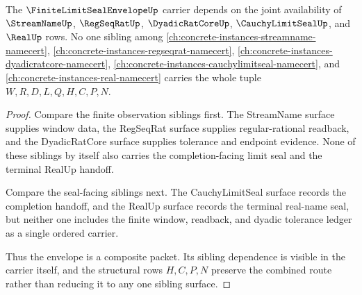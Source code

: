 \begin{theorem}
\label{thm:finite-limit-seal-envelope-sibling-dependency}
The $\FiniteLimitSealEnvelopeUp$ carrier depends on the joint availability of $\StreamNameUp$, $\RegSeqRatUp$, $\DyadicRatCoreUp$, $\CauchyLimitSealUp$, and $\RealUp$ rows. No one sibling among \autoref{ch:concrete-instances-streamname-namecert}, \autoref{ch:concrete-instances-regseqrat-namecert}, \autoref{ch:concrete-instances-dyadicratcore-namecert}, \autoref{ch:concrete-instances-cauchylimitseal-namecert}, and \autoref{ch:concrete-instances-real-namecert} carries the whole tuple $W,R,D,L,Q,H,C,P,N$.
\end{theorem}
\begin{proof}
Compare the finite observation siblings first. The StreamName surface supplies window data, the RegSeqRat surface supplies regular-rational readback, and the DyadicRatCore surface supplies tolerance and endpoint evidence. None of these siblings by itself also carries the completion-facing limit seal and the terminal RealUp handoff.

Compare the seal-facing siblings next. The CauchyLimitSeal surface records the completion handoff, and the RealUp surface records the terminal real-name seal, but neither one includes the finite window, readback, and dyadic tolerance ledger as a single ordered carrier.

Thus the envelope is a composite packet. Its sibling dependence is visible in the carrier itself, and the structural rows $H,C,P,N$ preserve the combined route rather than reducing it to any one sibling surface.
\end{proof}

